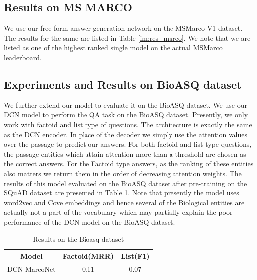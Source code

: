\subsection{Results on MS MARCO}
We use our free form answer generation network on the MSMarco V1 dataset. The results for the same are listed in Table \ref{im:res_marco}. We note that we are listed as one of the highest ranked single model on the actual MSMarco leaderboard.

\subsection{Experiments and Results on BioASQ dataset}

We further extend our model to evaluate it on the BioASQ dataset. We use our DCN model to perform the QA task on the BioASQ dataset. Presently, we only work with factoid and list type of questions. The architecture is exactly the same as the DCN encoder. In place of the decoder we simply use the attention values over the passage to predict our answers. For both factoid and list type questions, the passage entities which attain attention more than a threshold are chosen as the correct answers. For the Factoid type answers, as the ranking of these entities also matters we return them in the order of decreasing attention weights. The results of this model evaluated on the BioASQ dataset after pre-training on the SQuAD dataset are presented in Table \ref{tab:bioasq_res}. Note that presently the model uses word2vec and Cove embeddings and hence several of the Biological entities are actually not a part of the vocabulary which may partially explain the poor performance of the DCN model on the BioASQ dataset.

\begin{table}
\centering
\begin{tabular}{|c|c|c|}
    \hline \hline
    Model & Factoid(MRR) & List(F1)\\
    \hline
    DCN MarcoNet& 0.11&0.07\\
    \hline \hline
\end{tabular}
    \caption{Results on the Bioasq dataset}
    \label{tab:bioasq_res}
\end{table}
